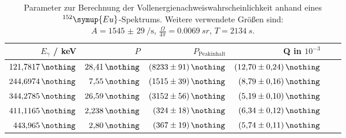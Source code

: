 \begin{table}[h!]
  \centering
  \caption{Parameter zur Berechnung der Vollenergienachweiswahrscheinlichkeit anhand eines $^{152}\symup{Eu}$-Spektrums. Weitere verwendete Größen sind: \\ $A=\SI{1545(29)}{\per \second}$, $\frac{\Omega}{4 \pi} = \SI{0.0069}{sr}$, $T=\SI{2134}{s}$.}
  \label{tab:vw}
  \begin{tabular}{ r  r  r  r  r  r  }
    \bottomrule
              $E_{\gamma}$ / keV \cite{nucleide} & $P$ \cite{nucleide}   & $P_{\text{Peakinhalt}}$    & Q in $10^{-3}$            \\ %
    \midrule
                $\SI{121.7817}{\nothing}$        & $\SI{28.41}{\nothing}$& $\SI{8233 (91)}{\nothing}$ & $\SI{12.70 (24)}{\nothing}$            \\ %
                $\SI{244.6974}{\nothing}$        & $\SI{ 7.55}{\nothing}$& $\SI{1515 (39)}{\nothing}$ & $\SI{ 8.79 (16)}{\nothing}$            \\ %
                $\SI{344.2785}{\nothing}$        & $\SI{26.59}{\nothing}$& $\SI{3152 (56)}{\nothing}$ & $\SI{ 5.19 (10)}{\nothing}$            \\ %
                $\SI{411.1165}{\nothing}$        & $\SI{2.238}{\nothing}$& $\SI{ 324 (18)}{\nothing}$ & $\SI{ 6.34 (12)}{\nothing}$            \\ %
                $\SI{ 443.965}{\nothing}$        & $\SI{ 2.80}{\nothing}$& $\SI{ 367 (19)}{\nothing}$ & $\SI{ 5.74 (11)}{\nothing}$            \\ %

\end{tabular}
\end{table}
